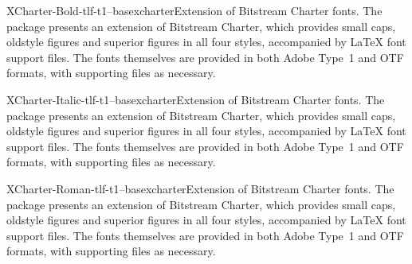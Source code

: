 \documentclass{ddltxtyp}
\begin{document}
\begin{package}{XCharter-Bold-tlf-t1--base}{xcharter}{Extension of Bitstream Charter fonts.}
The package presents an extension of Bitstream Charter, which
provides small caps, oldstyle figures and superior figures in
all four styles, accompanied by {\LaTeX} font support files. The
fonts themselves are provided in both Adobe Type~1 and OTF
formats, with supporting files as necessary.
\end{package}
\begin{package}{XCharter-Italic-tlf-t1--base}{xcharter}{Extension of Bitstream Charter fonts.}
The package presents an extension of Bitstream Charter, which
provides small caps, oldstyle figures and superior figures in
all four styles, accompanied by {\LaTeX} font support files. The
fonts themselves are provided in both Adobe Type~1 and OTF
formats, with supporting files as necessary.
\end{package}
\begin{package}{XCharter-Roman-tlf-t1--base}{xcharter}{Extension of Bitstream Charter fonts.}
The package presents an extension of Bitstream Charter, which
provides small caps, oldstyle figures and superior figures in
all four styles, accompanied by {\LaTeX} font support files. The
fonts themselves are provided in both Adobe Type~1 and OTF
formats, with supporting files as necessary.
\end{package}

\end{document}
